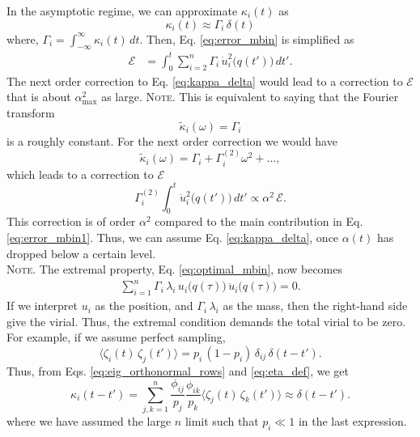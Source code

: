 \documentclass[reprint]{revtex4-1}
\newcommand{\note}[1]{{\color{DarkGreen}\footnotesize \textsc{Note.} #1}}
\begin{document}
In the asymptotic regime,
we can approximate $\kappa_i(t)$ as
%
\begin{equation}
  \kappa_i(t) \approx \Gamma_i \, \delta(t)
  \label{eq:kappa_delta}
\end{equation}
%
where, $\Gamma_i = \int_{-\infty}^\infty \kappa_i(t) \, dt$.
%
Then, Eq. \eqref{eq:error_mbin} is simplified as
%
\begin{align}
  \mathcal E
  &=
  \int_0^t
  \sum_{i = 2}^n
  \Gamma_i \, \dot u_i^2\bigl( q(t') \bigr) \, dt'.
  \label{eq:error_mbin1}
\end{align}
%
The next order correction to Eq. \eqref{eq:kappa_delta}
would lead to a correction to $\mathcal E$
that is about $\alpha_{\max}^2$ as large.
%
\note{This is equivalent to saying that the Fourier transform
  $$
  \tilde \kappa_i(\omega) = \Gamma_i
  $$
  is a roughly constant.
  For the next order correction we would have
  $$
  \tilde \kappa_i(\omega) = \Gamma_i + \Gamma^{(2)}_i \omega^2 + \dots,
  $$
  which leads to a correction to $\mathcal E$
  $$
  \Gamma^{(2)}_i
  \int_0^t \ddot u_i^2\bigl( q(t') \bigr) \, dt'
  \propto
  \alpha^2 \, \mathcal E.
  $$
  This correction is of order $\alpha^2$
  compared to the main contribution in Eq. \eqref{eq:error_mbin1}.
  Thus, we can assume Eq. \eqref{eq:kappa_delta},
  once $\alpha(t)$ has dropped below a certain level.
  \\
}
\note{
  The extremal property, Eq. \eqref{eq:optimal_mbin},
  now becomes
  \begin{align}
    \sum_{i=1}^n
      \Gamma_i \, \lambda_i \,
      u_i\bigl( q(\tau) \bigr) \,
      \ddot u_i\bigl( q(\tau) \bigr) = 0.
    \label{eq:optimal_mbin1}
  \end{align}
  If we interpret $u_i$ as the position,
  and $\Gamma_i \, \lambda_i$ as the mass,
  then the right-hand side give the virial.
  Thus, the extremal condition demands
  the total virial to be zero.
  $$\,$$
}
%
For example,
if we assume perfect sampling,
%
\begin{equation}
  \langle \zeta_i(t) \, \zeta_j(t') \rangle
  =
  p_i \, (1 - p_i) \, \delta_{ij} \, \delta(t - t').
  \label{eq:zz_perfect}
\end{equation}
%
Thus, from Eqs. \eqref{eq:eig_orthonormal_rows} and \eqref{eq:eta_def},
we get
%
\begin{equation}
  \kappa_i(t - t')
  =
  \sum_{j,k = 1}^n
  \frac{ \phi_{ij} } { p_j }
  \frac{ \phi_{ik} } { p_k }
  \langle \zeta_j(t) \, \zeta_k(t') \rangle
  \approx \delta(t - t').
  \label{eq:kappa_perfect}
\end{equation}
%
where we have assumed the large $n$ limit
such that $p_i \ll 1$
in the last expression.
\end{document}
